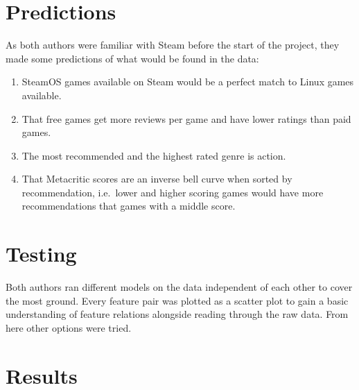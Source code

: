 \documentclass[10pt,journal,compsoc]{IEEEtran}
\begin{document}

\section{Predictions}

As both authors were familiar with Steam before the start of the project, they
made some predictions of what would be found in the data:

\begin{enumerate}
    \item SteamOS games available on Steam would be a perfect match to Linux
    games available.

    \item That free games get more reviews per game and have lower ratings than
    paid games.

    \item The most recommended and the highest rated genre is action.

    \item That Metacritic scores are an inverse bell curve when sorted by
    recommendation, i.e.\ lower and higher scoring games would have more
    recommendations that games with a middle score.
\end{enumerate}



\section{Testing}

Both authors ran different models on the data independent of each other to
cover the most ground. Every feature pair was plotted as a scatter plot to
gain a basic understanding of feature relations alongside reading through the
raw data. From here other options were tried.



\section{Results}
\end{document}
